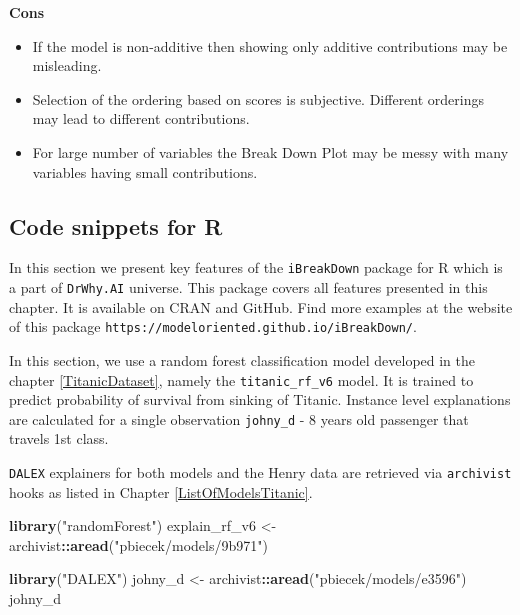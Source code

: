\documentclass[12pt,]{krantz}
\newenvironment{Shaded}{\begin{snugshade}}{\end{snugshade}}
\newcommand{\KeywordTok}[1]{\textcolor[rgb]{0.13,0.29,0.53}{\textbf{#1}}}
\newcommand{\NormalTok}[1]{#1}
\newcommand{\OperatorTok}[1]{\textcolor[rgb]{0.81,0.36,0.00}{\textbf{#1}}}
\newcommand{\StringTok}[1]{\textcolor[rgb]{0.31,0.60,0.02}{#1}}
\providecommand{\tightlist}{%
  \setlength{\itemsep}{0pt}\setlength{\parskip}{0pt}}
\theoremstyle{definition}
\theoremstyle{definition}
\theoremstyle{definition}
\theoremstyle{remark}
\begin{document}
\textbf{Cons}

\begin{itemize}
\tightlist
\item
  If the model is non-additive then showing only additive contributions
  may be misleading.
\item
  Selection of the ordering based on scores is subjective. Different
  orderings may lead to different contributions.
\item
  For large number of variables the Break Down Plot may be messy with
  many variables having small contributions.
\end{itemize}

\hypertarget{code-snippets-for-r}{%
\subsection{Code snippets for R}\label{code-snippets-for-r}}

In this section we present key features of the \texttt{iBreakDown}
package for R \citep{iBreakDownRPackage} which is a part of
\texttt{DrWhy.AI} universe. This package covers all features presented
in this chapter. It is available on CRAN and GitHub. Find more examples
at the website of this package
\texttt{https://modeloriented.github.io/iBreakDown/}.

In this section, we use a random forest classification model developed
in the chapter \ref{TitanicDataset}, namely the \texttt{titanic\_rf\_v6}
model. It is trained to predict probability of survival from sinking of
Titanic. Instance level explanations are calculated for a single
observation \texttt{johny\_d} - 8 years old passenger that travels 1st
class.

\texttt{DALEX} explainers for both models and the Henry data are
retrieved via \texttt{archivist} hooks as listed in Chapter
\ref{ListOfModelsTitanic}.

\begin{Shaded}
\begin{Highlighting}[]
\KeywordTok{library}\NormalTok{(}\StringTok{"randomForest"}\NormalTok{)}
\NormalTok{explain_rf_v6 <-}\StringTok{ }\NormalTok{archivist}\OperatorTok{::}\KeywordTok{aread}\NormalTok{(}\StringTok{"pbiecek/models/9b971"}\NormalTok{)}

\KeywordTok{library}\NormalTok{(}\StringTok{"DALEX"}\NormalTok{)}
\NormalTok{johny_d <-}\StringTok{ }\NormalTok{archivist}\OperatorTok{::}\KeywordTok{aread}\NormalTok{(}\StringTok{"pbiecek/models/e3596"}\NormalTok{)}
\NormalTok{johny_d}
\end{Highlighting}
\end{Shaded}
\end{document}
